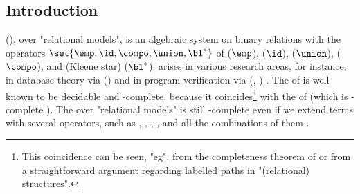 

%
%
%
%
%
%
%
%
%
%
%
%
%
%
%
%
%
%
%
%
%

%
\begin{scope}

\section{Introduction} \label{section: introduction}
\AP
\intro*{} (\reintro*{}), \intro*{} over "relational models",
is an algebraic system on binary relations with the operators $\set{\emp, \id, \compo, \union, \bl^{*}}$ of
 ($\emp$),
 ($\id$),
 ($\union$),
 ($\compo$),
and  (Kleene star) ($\bl^{*}$).
 arises in various research areas,
for instance,
in database theory via \intro*{} () \cite{calvaneseRewritingRegularExpressions1999} and
in program verification via \intro*{} (\reintro*{}, \reintro*{}) \cite{kozenKleeneAlgebraTests1996}.
The  of  is well-known to be decidable and -complete,
because it coincides\footnote{\label{footnote: lang and REL equiv}%
This coincidence can be seen, "eg", from the completeness theorem of  \cite{kozenCompletenessTheoremKleene1994} or from a straightforward argument regarding labelled paths in "(relational) structures".} with the  of  (which is -complete \cite{meyerEquivalenceProblemRegular1972}).
The  over "relational models" is still -complete even if
we extend  terms with several operators,
such as
 \cite{kozenKleeneAlgebraTests1996},
 \cite{brunetKleeneAlgebraConverse2014},
 \cite{nakamuraExistentialCalculiRelations2023,pousCompletenessTheoremsKleene2024},
 \cite{nakamuraDerivativesGraphsPositive2025},
and all the combinations of them \cite[Cor.~6.7]{nakamuraDerivativesGraphsPositive2025}.


\end{scope}
